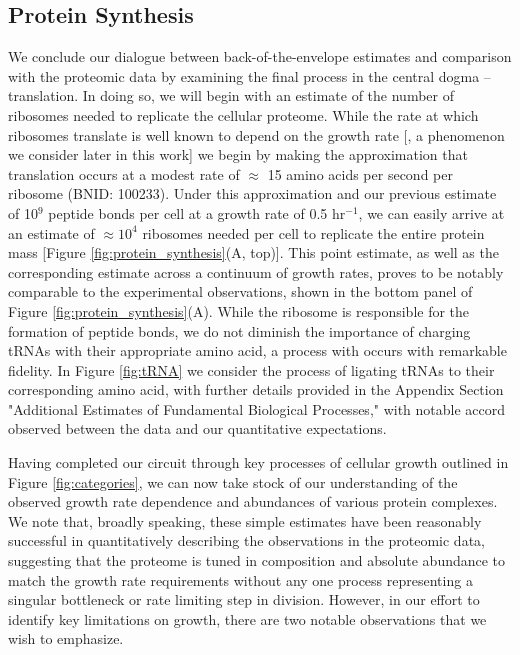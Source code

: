 \subsection{Protein Synthesis}
We conclude our dialogue between back-of-the-envelope estimates and
comparison with the proteomic data by examining the final process in the
central dogma -- translation. In doing so, we will begin with an estimate of
the number of ribosomes needed to replicate the cellular proteome. While the
rate at which ribosomes translate is well known to depend on the growth
rate [\cite{dai2018}, a phenomenon we consider later in this work] we begin by making
the approximation that translation occurs at a modest rate of $\approx$ 15
amino acids per second per ribosome (BNID: 100233). Under this approximation
and our previous estimate of 10$^{9}$ peptide bonds per cell at a growth rate
of 0.5 hr$^{-1}$, we can easily arrive at an estimate of $\approx 10^4$
ribosomes needed per cell to replicate the entire protein mass
[Figure \ref{fig:protein_synthesis}(A, top)]. This point estimate, as well as the
corresponding estimate across a continuum of growth rates, proves to be
notably comparable to the experimental observations, shown in the bottom
panel of Figure \ref{fig:protein_synthesis}(A). While the ribosome is responsible for
the formation of peptide bonds, we do not diminish the importance of charging
tRNAs with their appropriate amino acid, a process with occurs with
remarkable fidelity. In Figure \ref{fig:tRNA} we consider the process of ligating tRNAs
to their corresponding amino acid, with further details provided in the Appendix Section "Additional Estimates of Fundamental Biological Processes," with notable accord observed between the
data and our quantitative expectations.

Having completed our circuit through key processes of cellular growth
outlined in Figure \ref{fig:categories}, we can now take stock of our understanding of the
observed growth rate dependence and abundances of various protein complexes. We
note that, broadly speaking, these simple estimates have been reasonably successful in
quantitatively describing the observations in the proteomic data, suggesting
that the proteome is tuned in composition and absolute abundance to match the
growth rate requirements without any one process representing a singular
bottleneck or rate limiting step in division. However, in our effort to identify
key limitations on growth, there are two notable observations that we
wish to emphasize.

